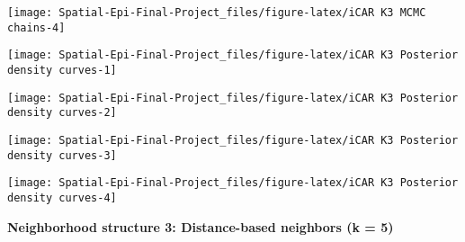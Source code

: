 \documentclass[]{article}
\begin{document}
\begin{center}\texttt{[image: Spatial-Epi-Final-Project\_files/figure-latex/iCAR K3  MCMC chains-4]} \end{center}

\begin{center}\texttt{[image: Spatial-Epi-Final-Project\_files/figure-latex/iCAR K3  Posterior density curves-1]} \end{center}

\begin{center}\texttt{[image: Spatial-Epi-Final-Project\_files/figure-latex/iCAR K3  Posterior density curves-2]} \end{center}

\begin{center}\texttt{[image: Spatial-Epi-Final-Project\_files/figure-latex/iCAR K3  Posterior density curves-3]} \end{center}

\begin{center}\texttt{[image: Spatial-Epi-Final-Project\_files/figure-latex/iCAR K3  Posterior density curves-4]} \end{center}

\textbf{Neighborhood structure 3: Distance-based neighbors (k = 5)}
\end{document}
